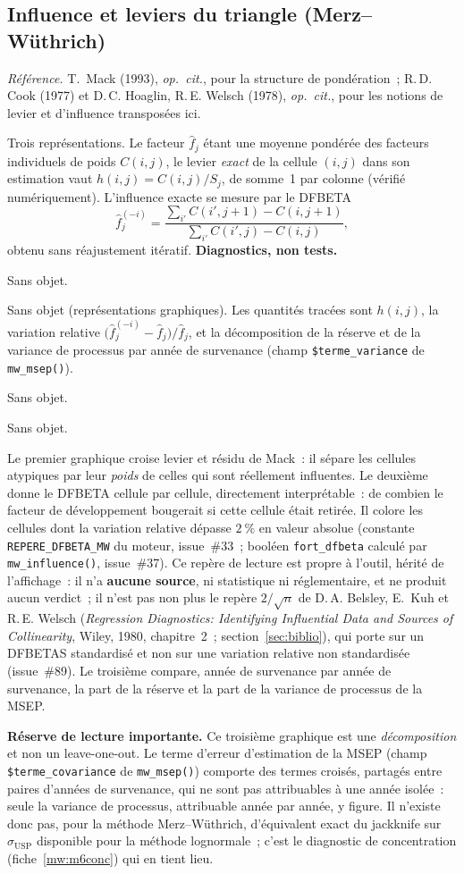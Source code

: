 \documentclass[a4paper,11pt]{article}
\newcommand{\code}[1]{\texttt{\small #1}}
\newcommand{\refl}[1]{{\small\textcolor{maincolor!70!black}{\textit{Référence.} #1}}\par\smallskip}
\newcounter{ficheid}
\newenvironment{fiche}[1]{%
  \stepcounter{ficheid}%
  \phantomsection
  \subsection{#1}%
  \label{fiche:\theficheid}%
}{%
  \end{description}\vspace{0.5em}%
}
\newcommand{\Cadre}{%
  \begin{description}[leftmargin=0pt, style=unboxed, itemsep=3pt, topsep=3pt, parsep=2pt]%
  \item[\textcolor{financeblue}{\textbf{1. Cadre, notations et hypothèses de validité (non testées).}}]}
\newcommand{\Hzero}{\item[\textcolor{financeblue}{\textbf{2. Hypothèse nulle.}}]}
\newcommand{\Stat}{\item[\textcolor{financeblue}{\textbf{3. Statistique de test.}}]}
\newcommand{\Loi}{\item[\textcolor{financeblue}{\textbf{4. Loi sous $H_0$.}}]}
\newcommand{\Pval}{\item[\textcolor{financeblue}{\textbf{5. p-value.}}]}
\newcommand{\Usage}{\item[\textcolor{financeblue}{\textbf{6. Usage et limites.}}]}
\begin{document}
\begin{fiche}{Influence et leviers du triangle (Merz--Wüthrich)}
\label{mw:influence}
\refl{T.~Mack (1993), \emph{op.\ cit.}, pour la structure de pondération~;
R.\,D. Cook (1977) et D.\,C. Hoaglin, R.\,E. Welsch (1978), \emph{op.\ cit.},
pour les notions de levier et d'influence transposées ici.}
\Cadre
Trois représentations. Le facteur $\hat f_j$ étant une moyenne pondérée des
facteurs individuels de poids $C(i,j)$, le levier \emph{exact} de la cellule
$(i,j)$ dans son estimation vaut $h(i,j) = C(i,j)/S_j$, de somme~1 par colonne
(vérifié numériquement). L'influence exacte se mesure par le DFBETA
\[
  \hat f_j^{(-i)} = \frac{\sum_{i'} C(i',j+1) - C(i,j+1)}{\sum_{i'} C(i',j) - C(i,j)},
\]
obtenu sans réajustement itératif. \textbf{Diagnostics, non tests.}
\Hzero
Sans objet.
\Stat
Sans objet (représentations graphiques). Les quantités tracées sont $h(i,j)$, la
variation relative $\big(\hat f_j^{(-i)} - \hat f_j\big)/\hat f_j$, et la
décomposition de la réserve et de la variance de processus par année de
survenance (champ \code{\$terme\_variance} de \code{mw\_msep()}).
\Loi
Sans objet.
\Pval
Sans objet.
\Usage
Le premier graphique croise levier et résidu de Mack~: il sépare les cellules
atypiques par leur \emph{poids} de celles qui sont réellement influentes. Le
deuxième donne le DFBETA cellule par cellule, directement interprétable~: de
combien le facteur de développement bougerait si cette cellule était retirée. Il colore les
cellules dont la variation relative dépasse $2~\%$ en valeur absolue (constante
\code{REPERE\_DFBETA\_MW} du moteur, issue~\#33~; booléen \code{fort\_dfbeta} calculé par
\code{mw\_influence()}, issue~\#37). Ce repère de lecture est propre à l'outil,
hérité de l'affichage~: il n'a \textbf{aucune source}, ni statistique ni réglementaire, et ne
produit aucun verdict~; il n'est pas non plus le repère $2/\sqrt{n}$ de D.\,A. Belsley, E.~Kuh et R.\,E. Welsch
(\emph{Regression Diagnostics: Identifying Influential Data and Sources of Collinearity}, Wiley,
1980, chapitre~2~; section~\ref{sec:biblio}), qui porte sur un DFBETAS standardisé et non sur une variation relative non standardisée
(issue~\#89). Le troisième compare, année de survenance par année de survenance, la part de la
réserve et la part de la variance de processus de la MSEP.

\medskip
\textbf{Réserve de lecture importante.} Ce troisième graphique est une
\emph{décomposition} et non un leave-one-out. Le terme d'erreur d'estimation de
la MSEP (champ \code{\$terme\_covariance} de \code{mw\_msep()}) comporte des
termes croisés, partagés entre paires d'années de survenance, qui ne sont pas
attribuables à une année isolée~: seule la variance de processus, attribuable
année par année, y figure.
Il n'existe donc pas, pour la méthode Merz--Wüthrich, d'équivalent exact du
jackknife sur $\sigma_{\mathrm{USP}}$ disponible pour la méthode lognormale~;
c'est le diagnostic de concentration (fiche~\ref{mw:m6conc}) qui en tient lieu.
\end{fiche}
\end{document}
